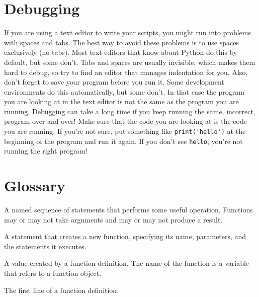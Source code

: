 \section{Debugging}
\label{editor}

If you are using a text editor to write your scripts, you might
run into problems with spaces and tabs.  The best way to avoid
these problems is to use spaces exclusively (no tabs).  Most text
editors that know about Python do this by default, but some
don't.
%
%
Tabs and spaces are usually invisible, which makes them
hard to debug, so try to find an editor that manages indentation
for you.
%
Also, don't forget to save your program before you run it.  Some
development environments do this automatically, but some don't.
In that case the program you are looking at in the text editor
is not the same as the program you are running.
%
Debugging can take a long time if you keep running the same,
incorrect, program over and over!
%
Make sure that the code you are looking at is the code you are running.
If you're not sure, put something like \verb"print('hello')" at the
beginning of the program and run it again.  If you don't see
\verb"hello", you're not running the right program!




\section{Glossary}

	
\begin{vocabulary}[function:] A named sequence of statements that performs some
useful operation.  Functions may or may not take arguments and may or
may not produce a result.
\end{vocabulary}
	
\begin{vocabulary}  A statement that creates a new function,
specifying its name, parameters, and the statements it executes.
\end{vocabulary}
	
\begin{vocabulary}  A value created by a function definition.
The name of the function is a variable that refers to a function
object.
\end{vocabulary}
	
\begin{vocabulary}[header:] The first line of a function definition.
\end{vocabulary}
	
